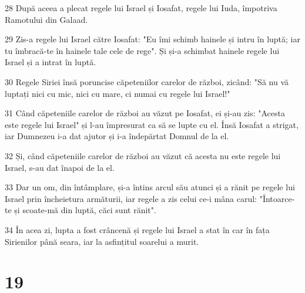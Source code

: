 \par 28 După aceea a plecat regele lui Israel și Iosafat, regele lui Iuda, împotriva Ramotului din Galaad.
\par 29 Zis-a regele lui Israel către Iosafat: "Eu îmi schimb hainele și intru în luptă; iar tu îmbracă-te în hainele tale cele de rege". Și și-a schimbat hainele regele lui Israel și a intrat în luptă.
\par 30 Regele Siriei însă poruncise căpeteniilor carelor de război, zicând: "Să nu vă luptați nici cu mic, nici cu mare, ci numai cu regele lui Israel!"
\par 31 Când căpeteniile carelor de război au văzut pe Iosafat, ei și-au zis: "Acesta este regele lui Israel" și l-au împresurat ca să se lupte cu el. Însă Iosafat a strigat, iar Dumnezeu i-a dat ajutor și i-a îndepărtat Domnul de la el.
\par 32 Și, când căpeteniile carelor de război au văzut că acesta nu este regele lui Israel, s-au dat înapoi de la el.
\par 33 Dar un om, din întâmplare, și-a întins arcul său atunci și a rănit pe regele lui Israel prin încheietura armăturii, iar regele a zis celui ce-i mâna carul: "Întoarce-te și scoate-mă din luptă, căci sunt rănit".
\par 34 În acea zi, lupta a fost crâncenă și regele lui Israel a stat în car în fața Sirienilor până seara, iar la asfințitul soarelui a murit.

\chapter{19}

